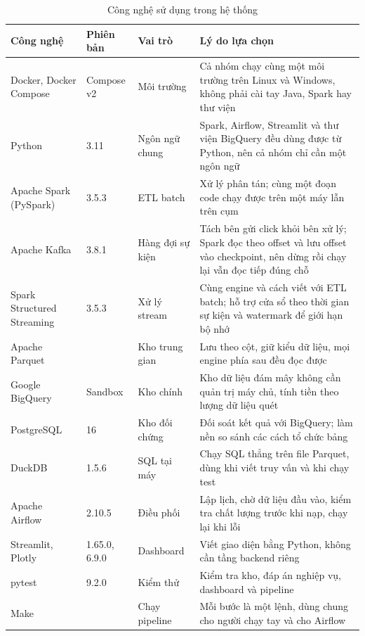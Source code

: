\begin{table}[htbp]
\centering
\small
\begin{tabularx}{\textwidth}{|l|l|l|X|}
\hline
\textbf{Công nghệ} & \textbf{Phiên bản} & \textbf{Vai trò} & \textbf{Lý do lựa chọn} \\ \hline
Docker, Docker Compose & Compose v2 & Môi trường & Cả nhóm chạy cùng một môi trường trên Linux và Windows, không phải cài tay Java, Spark hay thư viện \\ \hline
Python & 3.11 & Ngôn ngữ chung & Spark, Airflow, Streamlit và thư viện BigQuery đều dùng được từ Python, nên cả nhóm chỉ cần một ngôn ngữ \\ \hline
Apache Spark (PySpark) & 3.5.3 & ETL batch & Xử lý phân tán; cùng một đoạn code chạy được trên một máy lẫn trên cụm \\ \hline
Apache Kafka & 3.8.1 & Hàng đợi sự kiện & Tách bên gửi click khỏi bên xử lý; Spark đọc theo offset và lưu offset vào checkpoint, nên dừng rồi chạy lại vẫn đọc tiếp đúng chỗ \\ \hline
Spark Structured Streaming & 3.5.3 & Xử lý stream & Cùng engine và cách viết với ETL batch; hỗ trợ cửa sổ theo thời gian sự kiện và watermark để giới hạn bộ nhớ \\ \hline
Apache Parquet & & Kho trung gian & Lưu theo cột, giữ kiểu dữ liệu, mọi engine phía sau đều đọc được \\ \hline
Google BigQuery & Sandbox & Kho chính & Kho dữ liệu đám mây không cần quản trị máy chủ, tính tiền theo lượng dữ liệu quét \\ \hline
PostgreSQL & 16 & Kho đối chứng & Đối soát kết quả với BigQuery; làm nền so sánh các cách tổ chức bảng \\ \hline
DuckDB & 1.5.6 & SQL tại máy & Chạy SQL thẳng trên file Parquet, dùng khi viết truy vấn và khi chạy test \\ \hline
Apache Airflow & 2.10.5 & Điều phối & Lập lịch, chờ dữ liệu đầu vào, kiểm tra chất lượng trước khi nạp, chạy lại khi lỗi \\ \hline
Streamlit, Plotly & 1.65.0, 6.9.0 & Dashboard & Viết giao diện bằng Python, không cần tầng backend riêng \\ \hline
pytest & 9.2.0 & Kiểm thử & Kiểm tra kho, đáp án nghiệp vụ, dashboard và pipeline \\ \hline
Make & & Chạy pipeline & Mỗi bước là một lệnh, dùng chung cho người chạy tay và cho Airflow \\ \hline
\end{tabularx}
\caption{Công nghệ sử dụng trong hệ thống}
\label{tab:cong-nghe}
\end{table}

